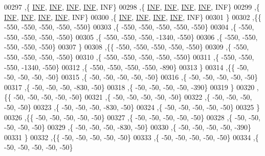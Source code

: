 \begin{DoxyCode}
00297   ,\{   \hyperlink{energy__const_8h_a12c2040f25d8e3a7b9e1c2024c618cb6}{INF},   \hyperlink{energy__const_8h_a12c2040f25d8e3a7b9e1c2024c618cb6}{INF},   \hyperlink{energy__const_8h_a12c2040f25d8e3a7b9e1c2024c618cb6}{INF},   \hyperlink{energy__const_8h_a12c2040f25d8e3a7b9e1c2024c618cb6}{INF},   INF\}
00298   ,\{   \hyperlink{energy__const_8h_a12c2040f25d8e3a7b9e1c2024c618cb6}{INF},   \hyperlink{energy__const_8h_a12c2040f25d8e3a7b9e1c2024c618cb6}{INF},   \hyperlink{energy__const_8h_a12c2040f25d8e3a7b9e1c2024c618cb6}{INF},   \hyperlink{energy__const_8h_a12c2040f25d8e3a7b9e1c2024c618cb6}{INF},   INF\}
00299   ,\{   \hyperlink{energy__const_8h_a12c2040f25d8e3a7b9e1c2024c618cb6}{INF},   \hyperlink{energy__const_8h_a12c2040f25d8e3a7b9e1c2024c618cb6}{INF},   \hyperlink{energy__const_8h_a12c2040f25d8e3a7b9e1c2024c618cb6}{INF},   \hyperlink{energy__const_8h_a12c2040f25d8e3a7b9e1c2024c618cb6}{INF},   INF\}
00300   ,\{   \hyperlink{energy__const_8h_a12c2040f25d8e3a7b9e1c2024c618cb6}{INF},   \hyperlink{energy__const_8h_a12c2040f25d8e3a7b9e1c2024c618cb6}{INF},   \hyperlink{energy__const_8h_a12c2040f25d8e3a7b9e1c2024c618cb6}{INF},   \hyperlink{energy__const_8h_a12c2040f25d8e3a7b9e1c2024c618cb6}{INF},   INF\}
00301   \}
00302  ,\{\{  -550,  -550,  -550,  -550,  -550\}
00303   ,\{  -550,  -550,  -550,  -550,  -550\}
00304   ,\{  -550,  -550,  -550,  -550,  -550\}
00305   ,\{  -550,  -550,  -550, -1340,  -550\}
00306   ,\{  -550,  -550,  -550,  -550,  -550\}
00307   \}
00308  ,\{\{  -550,  -550,  -550,  -550,  -550\}
00309   ,\{  -550,  -550,  -550,  -550,  -550\}
00310   ,\{  -550,  -550,  -550,  -550,  -550\}
00311   ,\{  -550,  -550,  -550, -1340,  -550\}
00312   ,\{  -550,  -550,  -550,  -550,  -890\}
00313   \}
00314  ,\{\{   -50,   -50,   -50,   -50,   -50\}
00315   ,\{   -50,   -50,   -50,   -50,   -50\}
00316   ,\{   -50,   -50,   -50,   -50,   -50\}
00317   ,\{   -50,   -50,   -50,  -830,   -50\}
00318   ,\{   -50,   -50,   -50,   -50,  -390\}
00319   \}
00320  ,\{\{   -50,   -50,   -50,   -50,   -50\}
00321   ,\{   -50,   -50,   -50,   -50,   -50\}
00322   ,\{   -50,   -50,   -50,   -50,   -50\}
00323   ,\{   -50,   -50,   -50,  -830,   -50\}
00324   ,\{   -50,   -50,   -50,   -50,   -50\}
00325   \}
00326  ,\{\{   -50,   -50,   -50,   -50,   -50\}
00327   ,\{   -50,   -50,   -50,   -50,   -50\}
00328   ,\{   -50,   -50,   -50,   -50,   -50\}
00329   ,\{   -50,   -50,   -50,  -830,   -50\}
00330   ,\{   -50,   -50,   -50,   -50,  -390\}
00331   \}
00332  ,\{\{   -50,   -50,   -50,   -50,   -50\}
00333   ,\{   -50,   -50,   -50,   -50,   -50\}
00334   ,\{   -50,   -50,   -50,   -50,   -50\}

\end{DoxyCode}
